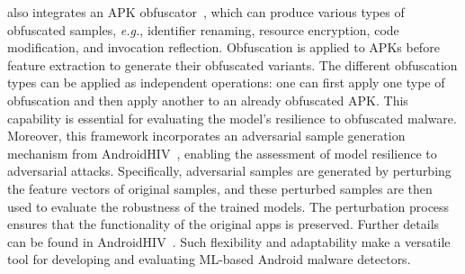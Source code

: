 \codename also integrates an APK obfuscator~\cite{aonzo2020obfuscapk}, which can produce various types of obfuscated samples, \textit{e.g.}, identifier renaming, resource encryption, code modification, and invocation reflection.
Obfuscation is applied to APKs before feature extraction to generate their obfuscated variants.
The different obfuscation types can be applied as independent operations: one can first apply one type of obfuscation and then apply another to an already obfuscated APK. 
This capability is essential for evaluating the model's resilience to obfuscated malware.
Moreover, this framework incorporates an adversarial sample generation mechanism from AndroidHIV~\cite{chen2019android}, enabling the assessment of model resilience to adversarial attacks.
Specifically, adversarial samples are generated by perturbing the feature vectors of original samples, and these perturbed samples are then used to evaluate the robustness of the trained models.
The perturbation process ensures that the functionality of the original apps is preserved.
Further details can be found in AndroidHIV~\cite{chen2019android}.
Such flexibility and adaptability make \codename a versatile tool for developing and evaluating ML-based Android malware detectors.








